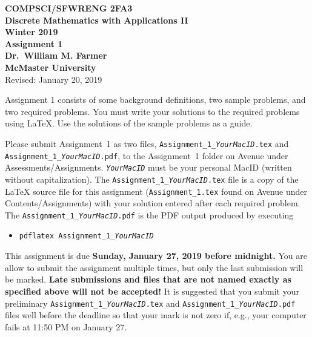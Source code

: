 \documentclass[11pt,fleqn]{article}
\begin{document}
\begin{center}

  {\large \textbf{COMPSCI/SFWRENG 2FA3}}\\[2mm]
  {\large \textbf{Discrete Mathematics with Applications II}}\\[2mm]
  {\large \textbf{Winter 2019}}\\[8mm]
  {\huge \textbf{Assignment 1}}\\[6mm]
  {\large \textbf{Dr.~William M. Farmer}}\\[2mm]
  {\large \textbf{McMaster University}}\\[6mm]
  {\large Revised: January 20, 2019}

\end{center}

\medskip

Assignment 1 consists of some background definitions, two sample
problems, and two required problems.  You must write your solutions to
the required problems using LaTeX.  Use the solutions of the sample
problems as a guide.

Please submit Assignment~1 as two files,
\texttt{Assignment\_1\_\emph{YourMacID}.tex} and
\texttt{Assignment\_1\_\emph{YourMacID}.pdf}, to the Assignment~1
folder on Avenue under Assessments/Assignments.
\texttt{\emph{YourMacID}} must be your personal MacID (written without
capitalization).  The \texttt{Assignment\_1\_\emph{YourMacID}.tex}
file is a copy of the LaTeX source file for this assignment
(\texttt{Assignment\_1.tex} found on Avenue under
Contents/Assignments) with your solution entered after each required
problem.  The \texttt{Assignment\_1\_\emph{YourMacID}.pdf} is the PDF
output produced by executing

\begin{itemize}

  \item[] \texttt{pdflatex Assignment\_1\_\emph{YourMacID}}

\end{itemize}

This assignment is due \textbf{Sunday, January 27, 2019 before
  midnight.}  You are allow to submit the assignment multiple times,
but only the last submission will be marked.  \textbf{Late submissions
  and files that are not named exactly as specified above will not be
  accepted!}  It is suggested that you submit your preliminary
\texttt{Assignment\_1\_\emph{YourMacID}.tex} and
\texttt{Assignment\_1\_\emph{YourMacID}.pdf} files well before the
deadline so that your mark is not zero if, e.g., your computer fails
at 11:50 PM on January 27.
\end{document}
